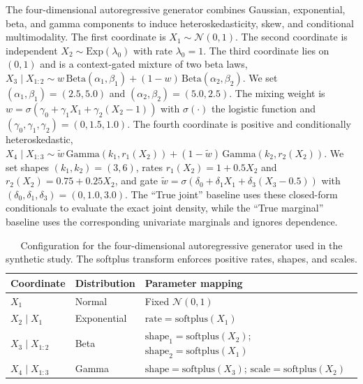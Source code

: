 \documentclass[11pt,a4paper,twoside]{book}\usepackage[]{graphicx}\usepackage[]{xcolor}
\begin{document}
The four-dimensional autoregressive generator combines Gaussian, exponential, beta, and gamma components to induce heteroskedasticity, skew, and conditional multimodality. The first coordinate is $X_1 \sim \mathcal{N}(0,1)$. The second coordinate is independent $X_2 \sim \mathrm{Exp}(\lambda_0)$ with rate $\lambda_0 = 1$. The third coordinate lies on $(0,1)$ and is a context-gated mixture of two beta laws, $X_3 \mid X_{1:2} \sim w\,\mathrm{Beta}(\alpha_1, \beta_1) + (1 - w)\,\mathrm{Beta}(\alpha_2, \beta_2)$. We set $(\alpha_1, \beta_1) = (2.5, 5.0)$ and $(\alpha_2, \beta_2) = (5.0, 2.5)$. The mixing weight is $w = \sigma(\gamma_0 + \gamma_1 X_1 + \gamma_2(X_2 - 1))$ with $\sigma(\cdot)$ the logistic function and $(\gamma_0, \gamma_1, \gamma_2) = (0, 1.5, 1.0)$. The fourth coordinate is positive and conditionally heteroskedastic, $X_4 \mid X_{1:3} \sim \tilde{w}\,\mathrm{Gamma}(k_1, r_1(X_2)) + (1 - \tilde{w})\,\mathrm{Gamma}(k_2, r_2(X_2))$. We set shapes $(k_1, k_2) = (3, 6)$, rates $r_1(X_2) = 1 + 0.5 X_2$ and $r_2(X_2) = 0.75 + 0.25 X_2$, and gate $\tilde{w} = \sigma(\delta_0 + \delta_1 X_1 + \delta_3(X_3 - 0.5))$ with $(\delta_0, \delta_1, \delta_3) = (0, 1.0, 3.0)$. The ``True joint'' baseline uses these closed-form conditionals to evaluate the exact joint density, while the ``True marginal'' baseline uses the corresponding univariate marginals and ignores dependence.

\begin{table}[t]
  \centering
  \caption{Configuration for the four-dimensional autoregressive generator used in the synthetic study. The softplus transform enforces positive rates, shapes, and scales.}
  \label{tab:autoregressive-config}
  \begin{tabular}{lll}
    \hline
    Coordinate & Distribution & Parameter mapping \\
    \hline
    $X_1$ & Normal & Fixed $\mathcal{N}(0,1)$ \\
    $X_2 \mid X_1$ & Exponential & $\mathrm{rate} = \mathrm{softplus}(X_1)$ \\
    $X_3 \mid X_{1:2}$ & Beta & $\mathrm{shape}_1 = \mathrm{softplus}(X_2)$; $\mathrm{shape}_2 = \mathrm{softplus}(X_1)$ \\
    $X_4 \mid X_{1:3}$ & Gamma & $\mathrm{shape} = \mathrm{softplus}(X_3)$; $\mathrm{scale} = \mathrm{softplus}(X_2)$ \\
    \hline
  \end{tabular}
\end{table}
\end{document}
